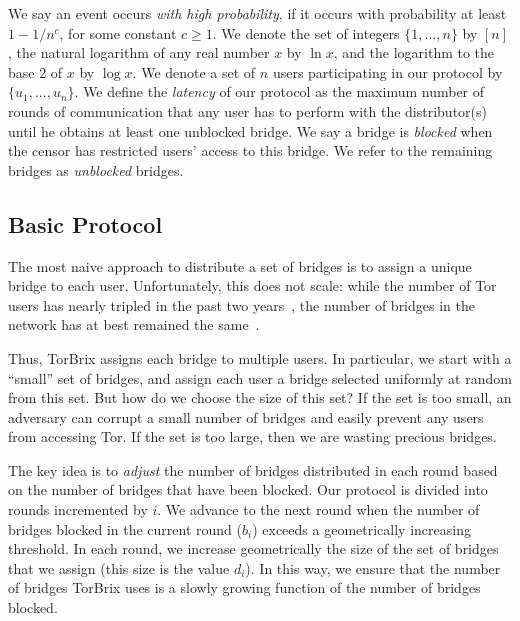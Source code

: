 \documentclass{llncs}
\newcommand{\fullpaper}[1]{#1}
\newcommand{\fullpaper}[1]{}
\newcommand{\sfsize}{\fontsize{0.73\baselineskip}{0.73\baselineskip}\selectfont}
\newcommand{\sans}[1]{\textsf{\sfsize \mbox{#1}}}
\newcommand{\brix}{\sans{TorBrix}\xspace}
\begin{document}
We say an event occurs \emph{with high probability}, if it occurs with probability at least \emph{${1-1/n^c}$}, for some constant ${c \geq 1}$. We denote the set of integers ${\{1,...,n\}}$ by $[n]$, the natural logarithm of any real number $x$ by $\ln{x}$, and the logarithm to the base 2 of $x$ by $\log{x}$. We denote a set of $n$ users participating in our protocol by ${\{u_1,...,u_n\}}$. We define the \emph{latency} of our protocol as the maximum number of rounds of communication that any user has to perform with the distributor(s) until he obtains at least one unblocked bridge. \fullpaper{We say a bridge is \emph{blocked} when the censor has restricted users' access to this bridge. We refer to the remaining bridges as \emph{unblocked} bridges.}

\subsection{Basic Protocol} \label{sec:basic-alg}
The most naive approach to distribute a set of bridges is to assign a unique bridge to each user.  Unfortunately, this does not scale: while the number of Tor users has nearly tripled in the past two years~\cite{Tor:BridgeUsers}, the number of bridges in the network has at best remained the same~\cite{Tor:Bridges}. %

Thus, \brix assigns each bridge to multiple users.  In particular, we start with a ``small'' set of bridges, and assign each user a bridge selected uniformly at random from this set.  But how do we choose the size of this set?  If the set is too small, an adversary can corrupt a small number of bridges and easily prevent any users from accessing Tor.  If the set is too large, then we are wasting precious bridges.

The key idea is to \emph{adjust} the number of bridges distributed in each round based on the number of bridges that have been blocked.  Our protocol is divided into rounds incremented by $i$.  We advance to the next round when the number of bridges blocked in the current round ($b_i$) exceeds a geometrically increasing threshold.  In each round, we increase geometrically the size of the set of bridges that we assign (this size is the value $d_i$).  In this way, we ensure that the number of bridges \brix uses is a slowly growing function of the number of bridges blocked.  %
\end{document}
